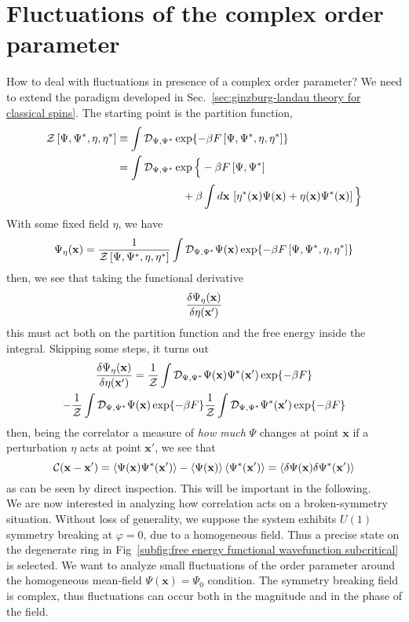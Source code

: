 \section{Fluctuations of the complex order parameter}

How to deal with fluctuations in presence of a complex order parameter? We need to extend the paradigm developed in Sec.~\ref{sec:ginzburg-landau theory for classical spins}. The starting point is the partition function,
\[
\begin{aligned}
    \mathcal{Z} \left[{\Psi,\Psi^*,\eta,\eta^*}\right] &\equiv \int \mathcal{D}_{\Psi,\Psi^*} \exp{ -\beta F\left[{\Psi,\Psi^*,\eta,\eta^*}\right] } \\
    &= \int \mathcal{D}_{\Psi,\Psi^*} \exp \Big\lbrace -\beta F\left[{\Psi,\Psi^*}\right] \\
    &\hspace{6em} + \beta \int d\mathbf{x} \, \left[{ \eta^*(\mathbf{x}) \Psi(\mathbf{x}) + \eta(\mathbf{x}) \Psi^*(\mathbf{x}) }\right]  \Big\rbrace
\end{aligned}
\]
With some fixed field $\eta$, we have
\[
    \Psi_\eta (\mathbf{x}) = \frac{1}{\mathcal{Z} \left[{\Psi,\Psi^*,\eta,\eta^*}\right]} \int \mathcal{D}_{\Psi,\Psi^*} \Psi(\mathbf{x}) \exp{ -\beta F\left[{\Psi,\Psi^*,\eta,\eta^*}\right] }
\]
then, we see that taking the functional derivative
\[
    \fdv{\Psi_\eta (\mathbf{x})}{\eta(\mathbf{x}')}
\]
this must act both on the partition function and the free energy inside the integral. Skipping some steps, it turns out
\begin{multline*}
    \fdv{\Psi_\eta (\mathbf{x})}{\eta(\mathbf{x}')} = \frac{1}{\mathcal{Z}} \int \mathcal{D}_{\Psi,\Psi^*} \Psi(\mathbf{x}) \Psi^* (\mathbf{x}') \exp{-\beta F} \\
    - \frac{1}{\mathcal{Z}} \int \mathcal{D}_{\Psi,\Psi^*} \Psi(\mathbf{x}) \exp{-\beta F} \frac{1}{\mathcal{Z}} \int \mathcal{D}_{\Psi,\Psi^*} \Psi^*(\mathbf{x}') \exp{-\beta F}
\end{multline*}
then, being the correlator a measure of \textit{how much} $\Psi$ changes at point $\mathbf{x}$ if a perturbation $\eta$ acts at point $\mathbf{x}'$, we see that
\[
    \mathcal{C} (\mathbf{x} - \mathbf{x}') = \ev{ \Psi(\mathbf{x}) \Psi^* (\mathbf{x}') } - \ev{ \vphantom{x'} \Psi(\mathbf{x}) } \ev{ \Psi^* (\mathbf{x}') } = \ev{ \vphantom{x'} \delta\Psi(\mathbf{x}) \delta\Psi^* (\mathbf{x}') }
\]
as can be seen by direct inspection. This will be important in the following.\\

We are now interested in analyzing how correlation acts on a broken-symmetry situation. Without loss of generality, we suppose the system exhibits $U(1)$ symmetry breaking at $\varphi=0$, due to a homogeneous field. Thus a precise state on the degenerate ring in Fig~\ref{subfig:free energy functional wavefunction subcritical} is selected. We want to analyze small fluctuations of the order parameter around the homogeneous mean-field $\Psi(\mathbf{x}) = \Psi_0$ condition. The symmetry breaking field is complex, thus fluctuations can occur both in the magnitude and in the phase of the field. 

